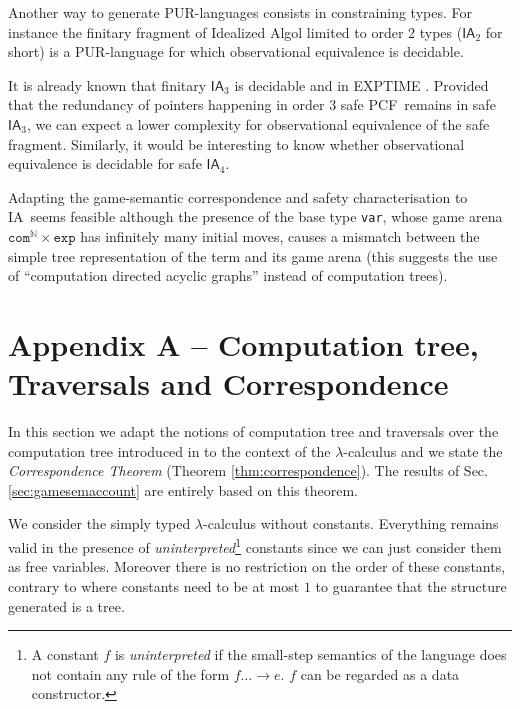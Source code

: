 \documentclass{llncs}
\newcommand\nat{\mathbb{N}}
\newcommand\ialgol{\textsf{IA}}
\newcommand\iacom{\texttt{com}}
\newcommand\iaexp{\texttt{exp}}
\newcommand\iavar{\texttt{var}}
\newcommand\pcf{\textsf{PCF}}
\begin{document}
Another way to generate PUR-languages consists in constraining types. For instance the finitary fragment of Idealized Algol \cite{Reynolds81}  limited to order $2$ types ($\ialgol_2$ for short) is a PUR-language for which observational equivalence is decidable.

It is already known that finitary $\ialgol_3$ is decidable and in EXPTIME \cite{DBLP:conf/fossacs/MurawskiW05}. 
Provided that the redundancy of pointers happening in order $3$ safe \pcf\ remains in safe $\ialgol_3$, we can expect a lower complexity for observational equivalence of the safe fragment.
Similarly, it would be interesting to know whether observational equivalence is decidable for safe $\ialgol_4$.

Adapting the game-semantic correspondence and safety characterisation to \ialgol\ seems feasible although the presence of the base type \iavar, whose game arena $\iacom^{\nat} \times \iaexp$ has infinitely many initial moves, causes a mismatch between the simple tree representation of the term and its game arena (this suggests the use of ``computation directed acyclic graphs'' instead of computation trees). 





\section*{Appendix A -- Computation tree, Traversals and Correspondence}
\label{sec:correspondence}

In this section we adapt the notions of computation tree and
traversals over the computation tree introduced in \cite{OngLics2006} to the context of the $\lambda$-calculus
and we state the \emph{Correspondence Theorem} (Theorem \ref{thm:correspondence}).
The results of Sec. \ref{sec:gamesemaccount} are entirely based on this theorem.

We consider the simply typed $\lambda$-calculus without constants. Everything remains valid in the presence of
\emph{uninterpreted}\footnote{A constant $f$ is \emph{uninterpreted}
if the small-step semantics of the language does not contain any rule of the form $f \dots \rightarrow e$. $f$ can be regarded as a data constructor.}
constants since we can just consider them as free variables. Moreover there is no restriction on the order of these constants, contrary to \cite{OngLics2006} where constants need to be at most $1$ to guarantee that the structure generated is a tree.
\end{document}
